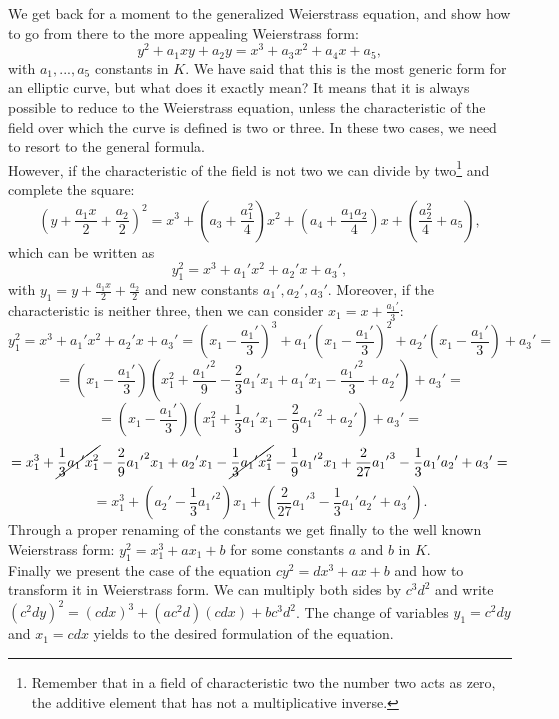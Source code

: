 \bigskip
\noindent
We get back for a moment to the generalized Weierstrass equation, and show how to go from there to the more appealing Weierstrass form:
$$y^2 + a_1xy + a_2y = x^3 + a_3x^2 + a_4x + a_5,$$ 
with $a_1,...,a_5$ constants in $K$. We have said that this is the most generic form for an elliptic curve, but what does it exactly mean? It means that it is always possible to reduce to the Weierstrass equation, unless the characteristic of the field over which the curve is defined is two or three. In these two cases, we need to resort to the general formula.
\\
However, if the characteristic of the field is not two we can divide by two\footnote{Remember that in a field of characteristic two the number two acts as zero, the additive element that has not a multiplicative inverse.} and complete the square: $$\left(y + \frac{a_1x}{2} + \frac{a_2}{2}\right)^2 = x^3 + \left(a_3 + \frac{a_1^2}{4}\right)x^2 + \left(a_4 + \frac{a_1a_2}{4}\right)x + \left(\frac{a_2^2}{4} + a_5\right),$$ which can be written as $$y_1^2 = x^3 + a_1{'}x^2 + a_2{'}x + a_3{'},$$ with $y_1 = y + \frac{a_1x}{2} + \frac{a_2}{2}$ and new constants $a_1{'}, a_2{'}, a_3{'}$. Moreover, if the characteristic is neither three, then we can consider $x_1 = x + \frac{a_1{'}}{3}$:
$$y_1^2 = x^3 + a_1{'}x^2 + a_2{'}x + a_3{'} = \left(x_1 - \frac{a_1{'}}{3}\right)^3 + a_1{'}\left(x_1 - \frac{a_1{'}}{3}\right)^2 + a_2{'}\left(x_1 - \frac{a_1{'}}{3}\right) + a_3{'} = $$ $$= \left(x_1 - \frac{a_1{'}}{3}\right)\left(x_1^2 + \frac{a_1{'}^2}{9} -\frac{2}{3}a_1{'}x_1 + a_1{'}x_1 - \frac{a_1{'}^2}{3} + a_2{'}\right) + a_3{'} = $$ $$=\left(x_1 - \frac{a_1{'}}{3}\right) \left(x_1^2 + \frac{1}{3}a_1{'}x_1 - 	\frac{2}{9}a_1{'}^2 + a_2{'}\right) + a_3{'} = $$ $$= x_1^3 + \cancel{\frac{1}{3}a_1{'}x_1^2} - \frac{2}{9}a_1{'}^2x_1 + a_2{'}x_1 - \cancel{\frac{1}{3}a_1{'}x_1^2} - \frac{1}{9}a_1{'}^2x_1 + \frac{2}{27}a_1{'}^3 - \frac{1}{3}a_1{'}a_2{'} + a_3{'} = $$ $$=x_1^3 + \left(a_2{'} - \frac{1}{3}a_1{'}^2\right)x_1 + \left(\frac{2}{27}a_1{'}^3 - \frac{1}{3}a_1{'}a_2{'} + a_3{'}\right).$$ 
Through a proper renaming of the constants we get finally to the well known Weierstrass form: $y_1^2 = x_1^3 + ax_1 + b$ for some constants $a$ and $b$ in $K$. 
\\
Finally we present the case of the equation $cy^2 = dx^3 + ax + b$ and how to transform it in Weierstrass form. We can multiply both sides by $c^3d^2$ and write $(c^2dy)^2 = (cdx)^3 + (ac^2d)(cdx) + bc^3d^2$. The change of variables $y_1 = c^2dy$ and $x_1 = cdx$ yields to the desired formulation of the equation.

